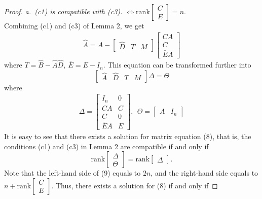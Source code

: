 \documentclass[english]{cccconf}
\theoremstyle{definition}
\begin{document}
\begin{proof} 
\textit{a.\ (c1) is compatible with (c3). $\Leftrightarrow \textrm{rank}\begin{bmatrix}
C\\E
\end{bmatrix}=n$}.\\
Combining (c1) and (c3) of Lemma 2, we get 
\begin{equation}\begin{split}
\hat{A}=A-\begin{bmatrix}
\hat{D}&T&M
\end{bmatrix}\begin{bmatrix}
CA\\C\\ \bar{E}A
\end{bmatrix}
\end{split}\end{equation}
where $T=\hat{B}-\hat{A}\hat{D},\ \bar{E}=E-I_n$.  This equation can be transformed further into
\begin{equation}
\begin{bmatrix}
\hat{A}&\hat{D}&T&M
\end{bmatrix}
\Delta=\Theta
\end{equation}
where 
\begin{align*}
\Delta=\begin{bmatrix}
I_n&0\\CA&C\\C&0\\ \bar{E}A&E
\end{bmatrix},\ \ \Theta=\begin{bmatrix}
A&I_n
\end{bmatrix}
\end{align*}
It is easy to see that there exists a solution for matrix equation (8), that is, the conditions (c1) and (c3) in Lemma 2 are compatible  if and only if 
\begin{equation}
\textrm{rank}\begin{bmatrix}
\Delta\\\Theta
\end{bmatrix}=\textrm{rank}\begin{bmatrix}
\Delta
\end{bmatrix}.
\end{equation}
Note that the left-hand side of (9) equals to $2n$, and
the right-hand side equals to $n+\textrm{rank}\begin{bmatrix}
C\\E
\end{bmatrix}$. Thus, there exists a solution for (8) if and only if

\end{proof}
\end{document}
